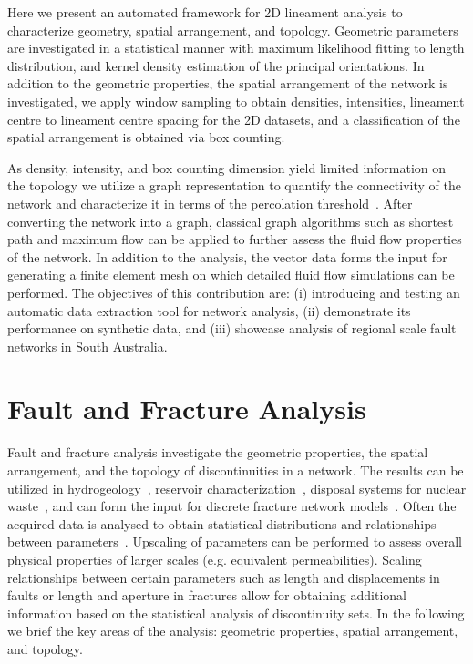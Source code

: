 \documentclass[a4paper,fleqn]{cas-sc}
\begin{document}
Here we present an automated framework for 2D lineament analysis to characterize geometry, spatial arrangement, and topology. Geometric parameters are investigated in a statistical manner with maximum likelihood fitting to length distribution, and kernel density estimation of the principal orientations. In addition to the geometric properties, the spatial arrangement of the network is investigated, we apply window sampling to obtain densities, intensities, lineament centre to lineament centre spacing for the 2D datasets, and a classification of the spatial arrangement is obtained via box counting. 

As density, intensity, and box counting dimension yield limited information on the topology we utilize a graph representation to quantify the connectivity of the network and characterize it in terms of the percolation threshold~\citep{Sanderson2018}. After converting the network into a graph, classical graph algorithms such as shortest path and maximum flow can be applied to further assess the fluid flow properties of the network. In addition to the analysis, the vector data forms the input for generating a finite element mesh on which detailed fluid flow simulations can be performed.
The objectives of this contribution are: (i) introducing and testing an automatic data extraction tool for network analysis, (ii) demonstrate its performance on synthetic data, and (iii) showcase analysis of regional scale fault networks in South Australia.

\section{Fault and Fracture Analysis}
Fault and fracture analysis investigate the geometric properties, the spatial arrangement, and the topology of discontinuities in a network. The results can be utilized in hydrogeology~\citep{Partsinevelou2011}, reservoir characterization~\citep{Olson2009, Abbasi2020}, disposal systems for nuclear waste~\citep{Reeves2012, Tsang2015}, and can form the input for discrete fracture network models~\citep{Miyoshi2018}. Often the acquired data is analysed to obtain statistical distributions and relationships between parameters~\citep[and references therein]{Zeeb2013}. Upscaling of parameters can be performed to assess overall physical properties of larger scales (e.g. equivalent permeabilities). Scaling relationships between certain parameters such as length and displacements in faults or length and aperture in fractures allow for obtaining additional information based on the statistical analysis of discontinuity sets. In the following we brief the key areas of the analysis: geometric properties, spatial arrangement, and topology.
\end{document}
